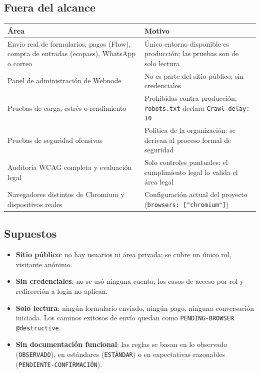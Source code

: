 \documentclass[11pt,a4paper]{article}
\newcommand{\code}[1]{\texttt{#1}}
\begin{document}
\subsection{Fuera del alcance}
\begin{table}[H]
\centering\small
\begin{tabularx}{\textwidth}{@{}>{\raggedright\arraybackslash}p{} X@{}}
\toprule
Área & Motivo \\
\midrule
Envío real de formularios, pagos (Flow), compra de entradas (ecopass), WhatsApp o correo &
  Único entorno disponible es producción; las pruebas son de solo lectura \\
Panel de administración de Webnode & No es parte del sitio público; sin credenciales \\
Pruebas de carga, estrés o rendimiento & Prohibidas contra producción; \code{robots.txt}
  declara \code{Crawl-delay: 10} \\
Pruebas de seguridad ofensivas & Política de la organización: se derivan al proceso formal de
  seguridad \\
Auditoría WCAG completa y evaluación legal & Solo controles puntuales; el cumplimiento legal
  lo valida el área legal \\
Navegadores distintos de Chromium y dispositivos reales & Configuración actual del proyecto
  (\code{browsers: ["chromium"]}) \\
\bottomrule
\end{tabularx}
\end{table}

\subsection{Supuestos}
\begin{itemize}
  \item \textbf{Sitio público}: no hay usuarios ni área privada; se cubre un único rol,
    visitante anónimo.
  \item \textbf{Sin credenciales}: no se usó ninguna cuenta; los casos de acceso por rol y
    redirección a login no aplican.
  \item \textbf{Solo lectura}: ningún formulario enviado, ningún pago, ninguna conversación
    iniciada. Los caminos exitosos de envío quedan como \code{PENDING-BROWSER @destructive}.
  \item \textbf{Sin documentación funcional}: las reglas se basan en lo observado
    (\code{OBSERVADO}), en estándares (\code{ESTÁNDAR}) o en expectativas razonables
    (\code{PENDIENTE-CONFIRMACIÓN}).
\end{itemize}
\end{document}
